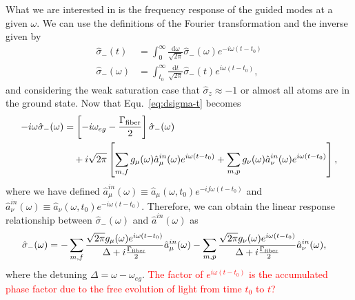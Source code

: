 \documentclass[preprint,aps,pra,onecolumn]{revtex4-1} %
\begin{document}
What we are interested in is the frequency response of the guided modes at a given $\omega$. We can use the definitions of the Fourier transformation and the inverse given by 
\begin{align}
\hat{\sigma}_-(t) &= \int_0^{\infty} \frac{\mathrm{d}\omega}{\sqrt{2\pi}} \hat{\sigma}_-(\omega) e^{-i\omega (t-t_0)}\\
\hat{\sigma}_-(\omega) &= \int_{t_0}^{\infty} \frac{\mathrm{d}t}{\sqrt{2\pi}} \hat{\sigma}_-(t) e^{i\omega (t-t_0)},
\end{align}
and considering the weak saturation case that $\hat{\sigma}_z\approx -1$ or almost all atoms are in the ground state. Now that Equ.~\eqref{eq:dsigma-t} becomes
\begin{align}
-i\omega \hat{\sigma}_-(\omega) &= \left[-i\omega_{eg}-\frac{\Gamma_{\rm fiber}}{2} \right]\hat{\sigma}_-(\omega) \nonumber\\
&\quad +i\sqrt{2\pi}\left[ \sum_{m,f} g_\mu(\omega) \hat{a}^{in}_\mu(\omega)e^{i\omega(t-t_0)}+\sum_{m,p} g_\nu(\omega) \hat{a}^{in}_\nu(\omega)e^{i\omega(t-t_0)}\right],
\end{align}
where we have defined $\hat{a}^{in}_\mu(\omega)\equiv \hat{a}_\mu(\omega, t_0)e^{-if\omega(t-t_0)}$ and $\hat{a}^{in}_\nu(\omega)\equiv \hat{a}_\nu(\omega, t_0)e^{-i\omega(t-t_0)}$. 
Therefore, we can obtain the linear response relationship between $\hat{\sigma}_-(\omega)$ and $\hat{a}^{in}(\omega)$ as
\begin{align}\label{eq:sigma-ain}
\hat{\sigma}_-(\omega) &= -\sum_{m,f} \frac{\sqrt{2\pi}g_\mu(\omega)e^{i\omega(t-t_0)}}{\Delta+i\frac{\Gamma_{\rm fiber}}{2}}\hat{a}^{in}_\mu(\omega)-\sum_{m,p} \frac{\sqrt{2\pi}g_\nu(\omega)e^{i\omega(t-t_0)}}{\Delta+i\frac{\Gamma_{\rm fiber}}{2}}\hat{a}^{in}_\nu(\omega),
\end{align}
where the detuning $\Delta=\omega-\omega_{eg}$. \textcolor{red}{The factor of $e^{i\omega(t-t_0)}$ is the accumulated phase factor due to the free evolution of light from time $t_0$ to $t$?}
\end{document}
